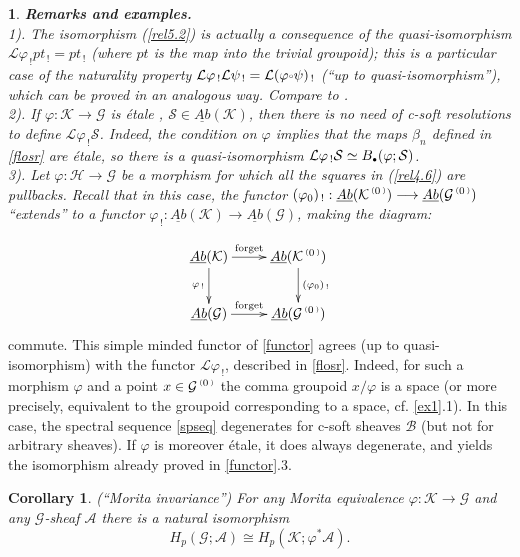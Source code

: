 \documentclass[a4paper]{article}
\newtheorem{cor} [st]{Corollary}
\newtheorem{num}[st]{}
\newcommand{\f}{\ensuremath{\varphi}}
\newcommand{\rmap}{\longrightarrow}
\newcommand{\Ka}{\ensuremath{\mathcal{K}}}
\newcommand{\Ha}{\ensuremath{\mathcal{H}}}
\newcommand{\G}{\ensuremath{\mathcal{G}}}
\newcommand{\A}{\ensuremath{\mathcal{A}}}
\newcommand{\el}{\ensuremath{\mathcal{L}}}
\newcommand{\es}{\ensuremath{\mathcal{S}}}
\newcommand{\B}{\ensuremath{\mathcal{B}}}
\newcommand{\abG}{\ensuremath{\underline{Ab}(\G)}}
\newcommand{\abK}{\ensuremath{\underline{Ab}(\Ka)}}
\newcommand{\ps}{{\raise 1pt\hbox{\tiny (}}}
\newcommand{\pd}{{\raise 1pt\hbox{\tiny )}}}
\newcommand{\nG}[1]{\ensuremath{\G^{\,\ps #1\,\pd}}}
\newcommand{\nK}[1]{\ensuremath{\Ka^{\,\ps #1\,\pd}}}
\def\cdot{{\raise 0.5pt\hbox{$\scriptscriptstyle\bullet$}}}
\def\compose{{\raise 1pt\hbox{$\scriptscriptstyle\circ$}}}
\begin{document}
\begin{num}
\label{wequiv}
\emph{
{\bf Remarks and examples.} \\
\hspace*{.3in} 1). The isomorphism (\ref{rel5.2}) is actually a consequence of the quasi-isomorphism $\el \f_{\, !} pt_{\, !}= pt_{\, !}$ (where $pt$ is the map into the trivial groupoid); this is a particular case of the naturality property $\el\f_{\, !} \el\psi_{\, !}= \el(\f\compose\psi)_{\, !}$ (``up to quasi-isomorphism''), which can be proved in an analogous way. Compare to \cite{We1}. \\
\hspace*{.3in} 2). If $\f: \Ka \rmap \G$ is  \'etale , $\es \in \abK$, then there is no need of c-soft resolutions to define $\el\f_{\, !}\es$. Indeed, the condition on $\f$ implies that the maps $\beta_n$ defined in \ref{flosr} are \'etale, so there is a quasi-isomorphism $\el\f_{\, !}\es \simeq B_{\cdot}(\f; \es)$.\\
\hspace*{.3in} 3). Let $\f: \Ha \rmap \G$ be a morphism for which all the squares in (\ref{rel4.6}) are pullbacks. Recall that in this case, the functor $(\f_{0})_{\, !}: \underline{Ab}(\nK{0}) \rmap \underline{Ab}(\nG{0})$ ``extends'' to a functor $\f_{\, !}: \abK \rmap \abG$, making the diagram:
}
\end{num}
\[ \xymatrix {
\abK  \ar[r]^-{{\rm forget}} \ar[d]_-{\f_{\, !}} & \underline{Ab}(\nK{0}) \ar[d]^-{(\f_{0})_{\, !}} \\
\abG  \ar[r]^-{{\rm forget}} & \underline{Ab}(\nG{0}) } \]
commute. This simple minded functor of \ref{functor} agrees (up to quasi-isomorphism) with the functor $\el\f_{\, !}$, described in \ref{flosr}. Indeed, for such a morphism $\f$ and a point $x\in \nG{0}$ the comma groupoid $x/\f$ is a space (or more precisely, equivalent to the groupoid corresponding to a space, cf. \ref{ex1}.1). In this case, the spectral sequence \ref{spseq}  degenerates for c-soft sheaves $\B$ (but not for arbitrary sheaves). If $\f$ is moreover \'etale, it does always degenerate, and yields the isomorphism already proved in \ref{functor}.3.\\






\begin{cor}
\label{morinv}
(``Morita invariance'') For any Morita equivalence $\f : \Ka \rmap \G$ and any $\G$-sheaf $\A$ there is a natural isomorphism
\[ H_{p}(\G; \A) \cong H_{p}(\Ka; \f^{*}\A) .\]
\end{cor}
\end{document}
